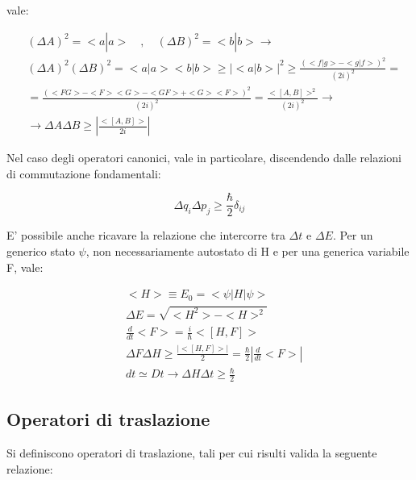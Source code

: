 \documentclass{article}
\begin{document}
vale:

\begin{equation}
    \begin{aligned}
         & (\Delta A)^2=<a|a> \quad , \quad (\Delta B)^2=<b|b> \rightarrow                         \\
         & (\Delta A)^2(\Delta B)^2=<a|a><b|b> \geq |<a|b>|^2 \geq \frac{(<f|g>-<g|f>)^2}{(2i)^2}= \\
         & =\frac{(<FG>-<F><G>-<GF>+<G><F>)^2}{(2i)^2}=\frac{<[A,B]>^2}{(2i)^2} \rightarrow        \\
         & \rightarrow \Delta A \Delta B \geq |\frac{<[A,B]>}{2i}|
    \end{aligned}
\end{equation}

Nel caso degli operatori canonici, vale in particolare, discendendo dalle relazioni di commutazione fondamentali:

\begin{equation}
    \Delta q_i \Delta p_j\geq \frac{\hbar}{2}\delta_{ij}
\end{equation}

E' possibile anche ricavare la relazione che intercorre tra $\Delta t$ e $\Delta E$.
Per un generico stato $\psi$, non necessariamente autostato di H e per una generica variabile F, vale:

\begin{equation}
    \begin{aligned}
         & <H>\equiv E_0= <\psi|H|\psi>                                               \\
         & \Delta E=\sqrt{<H^2>-<H>^2}                                                \\
         & \frac{d}{dt}<F>=\frac{i}{\hbar}<[H,F]>                                     \\
         & \Delta F\Delta H \geq \frac{|<[H,F]>|}{2}=\frac{\hbar}{2}|\frac{d}{dt}<F>| \\
         & dt \simeq Dt \rightarrow \Delta H\Delta t \geq \frac{\hbar}{2}
    \end{aligned}
\end{equation}




\subsection{Operatori di traslazione}
Si definiscono operatori di traslazione, tali per cui risulti valida la seguente relazione:
\end{document}
